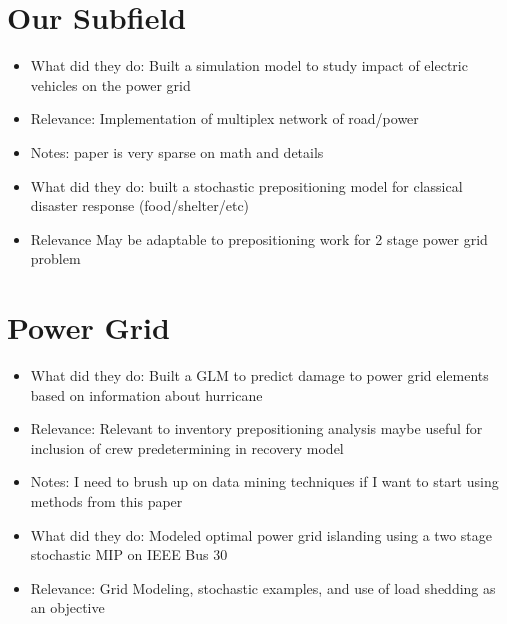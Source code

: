 \documentclass{article}
\begin{document}
	
	\section{Our Subfield}
	\cite{YangEA2018}
	\begin{itemize}
		\item What did they do: \newline
		Built a simulation model to study impact of electric vehicles on the power grid
		\item Relevance: \newline
		Implementation of multiplex network of road/power 
		\item Notes: \newline
		paper is very sparse on math and details 
	\end{itemize}
	\cite{SalmeronEA2010}
	\begin{itemize}
		\item What did they do: \newline
		built a stochastic prepositioning model for classical disaster response (food/shelter/etc)
		\item Relevance \newline
		May be adaptable to prepositioning work for 2 stage power grid problem
	\end{itemize}
	\section{Power Grid}
	\cite{GuikemaEA2010}
		\begin{itemize}
		\item What did they do: \newline
		Built a GLM to predict damage to power grid elements based on information about hurricane
		\item Relevance: \newline
		Relevant to inventory prepositioning analysis \newline
		maybe useful for inclusion of crew predetermining in recovery model
		\item Notes: \newline
		I need to brush up on data mining techniques if I want to start using methods from this paper
	\end{itemize}
	\cite{GolariEA2014}
	\begin{itemize}
		\item What did they do: \newline
		Modeled optimal power grid islanding using a two stage stochastic MIP on IEEE Bus 30
		\item Relevance: \newline
		Grid Modeling, stochastic examples, and use of load shedding as an objective
	\end{itemize}
\end{document}
